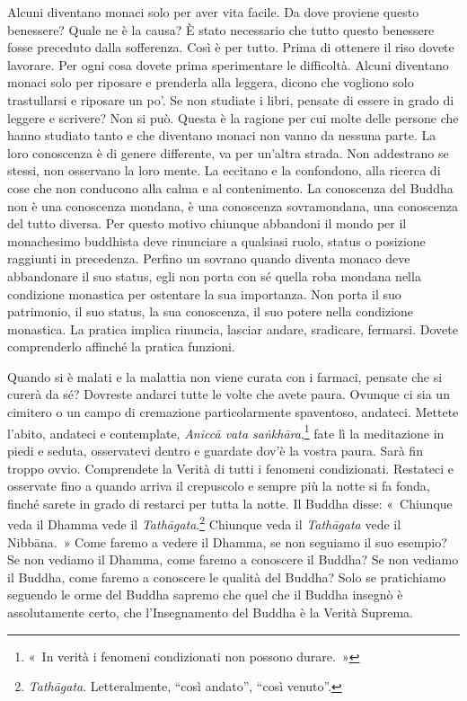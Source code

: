 Alcuni diventano monaci solo per aver vita facile. Da dove proviene
questo benessere? Quale ne è la causa? È stato necessario che tutto
questo benessere fosse preceduto dalla sofferenza. Così è per tutto.
Prima di ottenere il riso dovete lavorare. Per ogni cosa dovete prima
sperimentare le difficoltà. Alcuni diventano monaci solo per riposare e
prenderla alla leggera, dicono che vogliono solo trastullarsi e riposare
un po'. Se non studiate i libri, pensate di essere in grado di leggere e
scrivere? Non si può. Questa è la ragione per cui molte delle persone
che hanno studiato tanto e che diventano monaci non vanno da nessuna
parte. La loro conoscenza è di genere differente, va per un'altra
strada. Non addestrano se stessi, non osservano la loro mente. La
eccitano e la confondono, alla ricerca di cose che non conducono alla
calma e al contenimento. La conoscenza del Buddha non è una conoscenza
mondana, è una conoscenza sovramondana, una conoscenza del tutto
diversa. Per questo motivo chiunque abbandoni il mondo per il
monachesimo buddhista deve rinunciare a qualsiasi ruolo, status o
posizione raggiunti in precedenza. Perfino un sovrano quando diventa
monaco deve abbandonare il suo status, egli non porta con sé quella roba
mondana nella condizione monastica per ostentare la sua importanza. Non
porta il suo patrimonio, il suo status, la sua conoscenza, il suo potere
nella condizione monastica. La pratica implica rinuncia, lasciar andare,
sradicare, fermarsi. Dovete comprenderlo affinché la pratica funzioni.

Quando si è malati e la malattia non viene curata con i farmaci, pensate
che si curerà da sé? Dovreste andarci tutte le volte che avete paura.
Ovunque ci sia un cimitero o un campo di cremazione particolarmente
spaventoso, andateci. Mettete l'abito, andateci e contemplate,
\emph{Aniccā vata saṅkhāra},\footnote{«~In verità i fenomeni
  condizionati non possono durare.~»} fate lì la meditazione in piedi e
seduta, osservatevi dentro e guardate dov'è la vostra paura. Sarà fin
troppo ovvio. Comprendete la Verità di tutti i fenomeni condizionati.
Restateci e osservate fino a quando arriva il crepuscolo e sempre più la
notte si fa fonda, finché sarete in grado di restarci per tutta la
notte. Il Buddha disse: «~Chiunque veda il Dhamma vede il
\emph{Tathāgata}.\footnote{\emph{Tathāgata}. Letteralmente, ``così
  andato'', ``così venuto''.} Chiunque veda il \emph{Tathāgata} vede il
Nibbāna.~» Come faremo a vedere il Dhamma, se non seguiamo il suo
esempio? Se non vediamo il Dhamma, come faremo a conoscere il Buddha? Se
non vediamo il Buddha, come faremo a conoscere le qualità del Buddha?
Solo se pratichiamo seguendo le orme del Buddha sapremo che quel che il
Buddha insegnò è assolutamente certo, che l'Insegnamento del Buddha è la
Verità Suprema.

